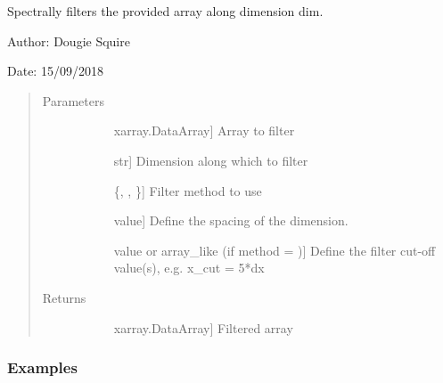 \documentclass[letterpaper,10pt,english]{sphinxmanual}
\begin{document}
\begin{fulllineitems}
\label{\detokenize{utils_doc:utils.fftfilt}}
Spectrally filters the provided array along dimension dim.

\begin{DUlineblock}{0em}
\item[] Author: Dougie Squire
\item[] Date: 15/09/2018
\end{DUlineblock}
\begin{quote}\begin{description}
\item[{Parameters}] \leavevmode\begin{description}
\item[{}] \leavevmode{[}xarray.DataArray{]}
Array to filter

\item[{}] \leavevmode{[}str{]}
Dimension along which to filter

\item[{}] \leavevmode{[}\{, , \}{]}
Filter method to use

\item[{}] \leavevmode{[}value{]}
Define the spacing of the dimension.

\item[{}] \leavevmode{[}value or array\_like (if method = ){]}
Define the filter cut-off value(s), e.g. x\_cut = 5*dx

\end{description}

\item[{Returns}] \leavevmode\begin{description}
\item[{}] \leavevmode{[}xarray.DataArray{]}
Filtered array

\end{description}

\end{description}\end{quote}
\subsubsection*{Examples}


\end{fulllineitems}
\end{document}
